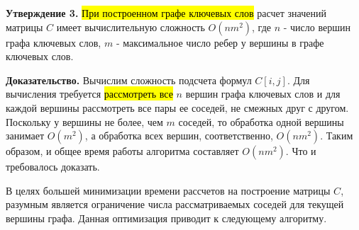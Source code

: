 \textbf{Утверждение 3.} \hl{При построенном графе ключевых слов} расчет значений матрицы $C$ имеет вычислительную сложность $O(nm^2)$, где $n$ - число вершин графа ключевых слов, $m$ - максимальное число ребер у вершины в графе ключевых слов.

\textbf{Доказательство.} Вычислим сложность подсчета формул $C[i,j]$. Для вычисления требуется \hl{рассмотреть все} $n$ вершин графа ключевых слов и для каждой вершины рассмотреть все пары ее соседей, не смежных друг с другом. Поскольку у вершины не более, чем $m$ соседей, то обработка одной вершины занимает $O(m^2)$, а обработка всех вершин, соответственно, $O(nm^2)$. Таким образом, и общее время работы алгоритма составляет $O(nm^2)$. Что и требовалось доказать.


В целях большей минимизации времени рассчетов на построение матрицы $C$, разумным является ограничение числа рассматриваемых соседей для текущей вершины графа. Данная оптимизация приводит к следующему алгоритму.


